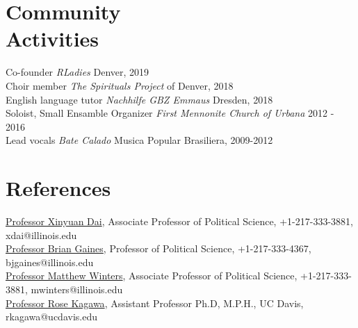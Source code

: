 \documentclass[margin, 10pt]{CVStyleTemplate}\usepackage[]{graphicx}\usepackage[]{color}
\begin{document}
\begin{resume}




\section{Community \\ Activities} 

Co-founder \emph{RLadies} Denver, 2019 \\
Choir member \emph{The Spirituals Project} of Denver, 2018 \\
English language tutor \emph{Nachhilfe GBZ Emmaus} Dresden, 2018 \\
Soloist, Small Ensamble Organizer \emph{First Mennonite Church of Urbana} 2012 - 2016\\
Lead vocals \emph{Bate Calado} Musica Popular Brasiliera, 2009-2012\\

\section{References}  
\href{http://www.pol.illinois.edu/people/xdai}{Professor Xinyuan Dai}, Associate Professor of Political Science, +1-217-333-3881, xdai@illinois.edu\\
\href{http://www.pol.illinois.edu/people/bjgaines}{Professor Brian Gaines}, Professor of Political Science, +1-217-333-4367, bjgaines@illinois.edu\\
\href{http://www.pol.illinois.edu/people/mwinters}{Professor Matthew Winters}, Associate Professor of Political Science, +1-217-333-3881, mwinters@illinois.edu\\
\href{https://health.ucdavis.edu/vprp/ourteam/index.html}{Professor Rose Kagawa}, Assistant Professor Ph.D, M.P.H., UC Davis, rkagawa@ucdavis.edu\\
\end{resume}
\end{document}

